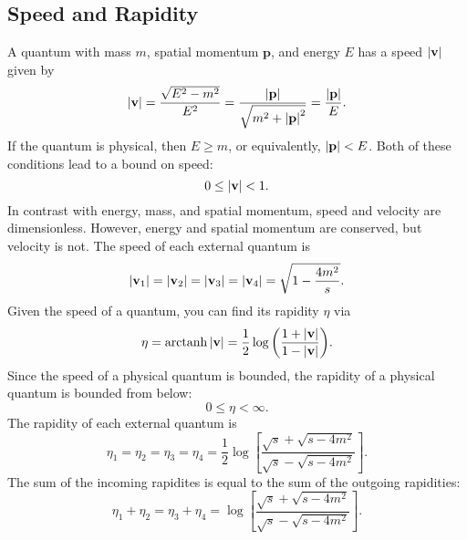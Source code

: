 \subsection{Speed and Rapidity}
A quantum with mass $m$, spatial momentum $\mathbf{p}$, and energy $E$ has a speed $\left\lvert \mathbf{v} \right\rvert$ given by
\begin{equation}
	\left\lvert \mathbf{v} \right\rvert = \frac{\sqrt{E^{2} - m^{2}}}{E^{2}} = \frac{\left\lvert \mathbf{p} \right\rvert}{\sqrt{m^{2} + \left\lvert \mathbf{p} \right\rvert^{2}}} = \frac{\left\lvert \mathbf{p} \right\rvert}{E}.
\end{equation}
If the quantum is physical, then $E \geq m$, or equivalently, $\left\lvert \mathbf{p} \right\rvert < E$. Both of these conditions lead to a bound on speed:
\begin{equation}
	0 \leq \left\lvert \mathbf{v} \right\rvert < 1.
\end{equation}
In contrast with energy, mass, and spatial momentum, speed and velocity are dimensionless. However, energy and spatial momentum are conserved, but velocity is not. The speed of each external quantum is
\begin{equation}
	\left\lvert \mathbf{v}_{1} \right\rvert = \left\lvert \mathbf{v}_{2} \right\rvert = \left\lvert \mathbf{v}_{3} \right\rvert = \left\lvert \mathbf{v}_{4} \right\rvert = \sqrt{1 - \frac{4 m^{2}}{s}}.
\end{equation}
Given the speed of a quantum, you can find its rapidity $\eta$ via
\begin{equation}
	\eta = \operatorname{arctanh}{\left\lvert \mathbf{v} \right\rvert} = \frac{1}{2} \log{\left( \frac{1 + \left\lvert \mathbf{v} \right\rvert}{1 - \left\lvert \mathbf{v} \right\rvert} \right)}.
\end{equation}
Since the speed of a physical quantum is bounded, the rapidity of a physical quantum is bounded from below:
\begin{equation}
	0 \leq \eta < \infty.
\end{equation}
The rapidity of each external quantum is
\begin{equation}
	\eta_{1} = \eta_{2} = \eta_{3} = \eta_{4} = \frac{1}{2} \log{\left[\frac{\sqrt{s} + \sqrt{s - 4 m^{2}}}{\sqrt{s} - \sqrt{s - 4 m^{2}}}\right]}.
\end{equation}
The sum of the incoming rapidites is equal to the sum of the outgoing rapidities:
\begin{equation}
	\eta_{1} + \eta_{2} = \eta_{3} + \eta_{4} = \log{\left[\frac{\sqrt{s} + \sqrt{s - 4 m^{2}}}{\sqrt{s} - \sqrt{s - 4 m^{2}}}\right]}.
\end{equation}
